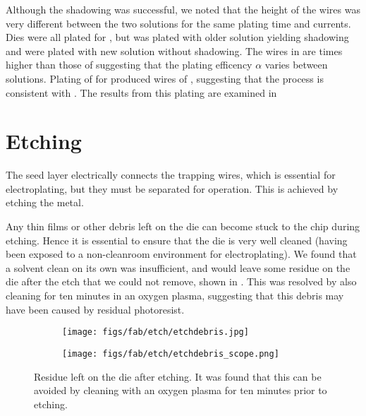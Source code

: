 Although the shadowing was successful, we noted that the height of the wires
was very different between the two solutions for the same plating time and
currents. Dies  were all plated for , but
 was plated with older solution yielding shadowing and  were
plated with new solution without shadowing. The wires in  are 
times higher than those of  suggesting that the plating efficency
$\alpha$ varies between solutions. Plating of  for  produced wires of , suggesting that the process is
consistent with . The results from this plating are
examined in 

\section{Etching}

The seed layer electrically connects the trapping wires, which is
essential for electroplating, but they must be separated for operation. This is
achieved by etching the metal.

Any thin films or other debris left on the die can become stuck to the chip
during etching. \cite{} Hence it is essential to ensure that the die is very
well cleaned (having been exposed to a non-cleanroom environment for
electroplating). We found that a solvent clean on its own was insufficient,
and would leave some residue on the die after the etch that we could not
remove, shown in . This was resolved by also cleaning
for ten minutes in an oxygen plasma, suggesting that this debris may have been
caused by residual photoresist.

\begin{figure}
  \centering
  \begin{subfigure}[b]{0.45\textwidth}
    \texttt{[image: figs/fab/etch/etchdebris.jpg]}
    \caption{}
  \end{subfigure}
  \hspace{1cm}
  \begin{subfigure}[b]{0.45\textwidth}
    \centering
    \texttt{[image: figs/fab/etch/etchdebris\_scope.png]}
    \caption{}
  \end{subfigure}
  \caption{Residue left on the die after etching. It was found that this can be
  avoided by cleaning with an oxygen plasma for ten minutes prior to etching.}
  \label{fab:fig:etchres}
\end{figure}

